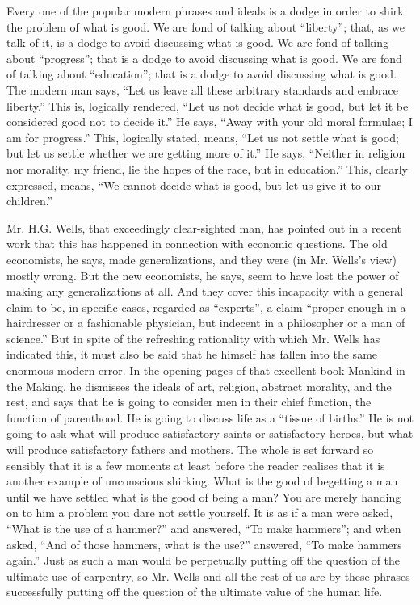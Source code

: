 Every one of the popular modern phrases and ideals is a dodge in order to shirk the problem of what is good. We are fond of talking about “liberty”; that, as we talk of it, is a dodge to avoid discussing what is good. We are fond of talking about “progress”; that is a dodge to avoid discussing what is good. We are fond of talking about “education”; that is a dodge to avoid discussing what is good. The modern man says, “Let us leave all these arbitrary standards and embrace liberty.” This is, logically rendered, “Let us not decide what is good, but let it be considered good not to decide it.” He says, “Away with your old moral formulae; I am for progress.” This, logically stated, means, “Let us not settle what is good; but let us settle whether we are getting more of it.” He says, “Neither in religion nor morality, my friend, lie the hopes of the race, but in education.” This, clearly expressed, means, “We cannot decide what is good, but let us give it to our children.”

Mr. H.G. Wells, that exceedingly clear-sighted man, has pointed out in a recent work that this has happened in connection with economic questions. The old economists, he says, made generalizations, and they were (in Mr. Wells’s view) mostly wrong. But the new economists, he says, seem to have lost the power of making any generalizations at all. And they cover this incapacity with a general claim to be, in specific cases, regarded as “experts”, a claim “proper enough in a hairdresser or a fashionable physician, but indecent in a philosopher or a man of science.” But in spite of the refreshing rationality with which Mr. Wells has indicated this, it must also be said that he himself has fallen into the same enormous modern error. In the opening pages of that excellent book Mankind in the Making, he dismisses the ideals of art, religion, abstract morality, and the rest, and says that he is going to consider men in their chief function, the function of parenthood. He is going to discuss life as a “tissue of births.” He is not going to ask what will produce satisfactory saints or satisfactory heroes, but what will produce satisfactory fathers and mothers. The whole is set forward so sensibly that it is a few moments at least before the reader realises that it is another example of unconscious shirking. What is the good of begetting a man until we have settled what is the good of being a man? You are merely handing on to him a problem you dare not settle yourself. It is as if a man were asked, “What is the use of a hammer?” and answered, “To make hammers”; and when asked, “And of those hammers, what is the use?” answered, “To make hammers again.” Just as such a man would be perpetually putting off the question of the ultimate use of carpentry, so Mr. Wells and all the rest of us are by these phrases successfully putting off the question of the ultimate value of the human life.

